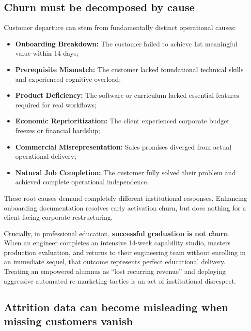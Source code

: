 \subsection{Churn must be decomposed by cause}

Customer departure can stem from fundamentally distinct operational causes:
\begin{itemize}
\item \textbf{Onboarding Breakdown:} The customer failed to achieve 1st meaningful value within 14 days;
\item \textbf{Prerequisite Mismatch:} The customer lacked foundational technical skills and experienced cognitive overload;
\item \textbf{Product Deficiency:} The software or curriculum lacked essential features required for real workflows;
\item \textbf{Economic Reprioritization:} The client experienced corporate budget freezes or financial hardship;
\item \textbf{Commercial Misrepresentation:} Sales promises diverged from actual operational delivery;
\item \textbf{Natural Job Completion:} The customer fully solved their problem and achieved complete operational independence.
\end{itemize}
These root causes demand completely different institutional responses. Enhancing onboarding documentation resolves early activation churn, but does nothing for a client facing corporate restructuring.

Crucially, in professional education, \textbf{successful graduation is not churn}. When an engineer completes an intensive 14-week capability studio, masters production evaluation, and returns to their engineering team without enrolling in an immediate sequel, that outcome represents perfect educational delivery. Treating an empowered alumnus as ``lost recurring revenue'' and deploying aggressive automated re-marketing tactics is an act of institutional disrespect.

\subsection{Attrition data can become misleading when missing customers vanish}

